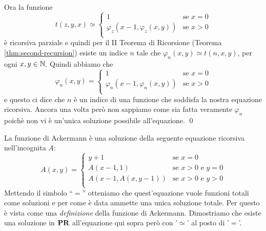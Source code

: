 \documentclass[runningheads,a4paper]{llncs}
\begin{document}
\begin{solution}
Ora la funzione 
$$
t(z,y,x) \simeq 
\begin{cases}
1                         & \mbox{se $x = 0$} \\
\varphi_z(x-1,\varphi_z(x,y)) & \mbox{se $x > 0$} \\
\end{cases}
$$
\`{e} ricorsiva parziale e quindi per il II Teorema di Ricorsione (Teorema \ref{thm:second-recursion}) esiste un indice
 $n$ tale che $\varphi_{n}(x,y) \simeq t(n,x,y)$, per ogni $x,y \in \mathbb{N}$. Quindi abbiamo che
$$
\varphi_{n}(x,y) = 
\begin{cases}
1                         & \mbox{se $x = 0$} \\
\varphi_n(x-1,\varphi_n(x,y)) & \mbox{se $x > 0$} \\
\end{cases}
$$
e questo ci dice che $n$ \`{e} un indice di una funzione che soddisfa la nostra equazione ricorsiva. Ancora una volta per\`{o}
 non sappiamo come sia fatta veramente $\varphi_n$ poich\`{e} non vi \`{e} un'unica soluzione possibile all'equazione.
\qed\end{solution}

\begin{exercise}
La funzione di Ackermann \`{e} una soluzione della seguente equazione ricorsiva nell'incognita $A$:
$$
A(x,y) =
\begin{cases}
y+1 & \mbox{se $x = 0$} \\
A(x-1,1)        & \mbox{se $x > 0$ e $y = 0$} \\
A(x-1,A(x,y-1)) & \mbox{se $x >0$ e $y>0$} \\
\end{cases}
$$
Mettendo il simbolo ``$=$'' otteniamo che quest'equazione vuole funzioni totali come soluzioni e per come \`{e} data ammette una unica 
 soluzione totale. Per questo \`{e} vista come una \emph{definizione} della funzione di Ackermann.
 Dimostriamo che esiste una soluzione in $\mathbf{PR}$ all'equazione qui sopra per\`{o} con '$\simeq$' al posto di '$=$'.
\end{exercise}
\end{document}
